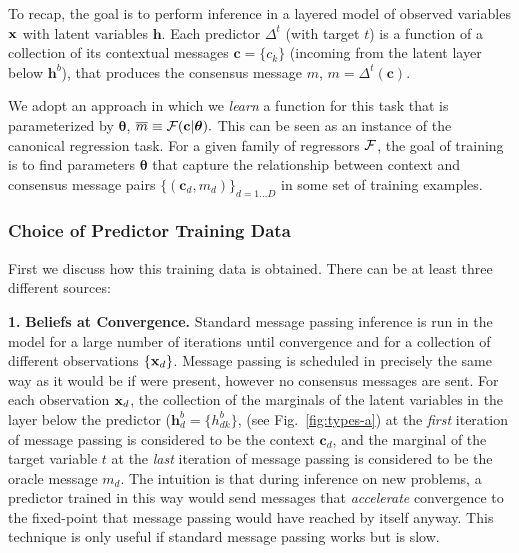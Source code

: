 To recap, the goal is to perform inference in a layered model of observed variables $\mathbf{x}$ with latent variables $\mathbf{h}$. Each predictor $\Delta^t$ (with target $t$) is a function of a collection of its contextual messages $\mathbf{c} = \{ c_k \}$ (incoming from the latent layer below $\mathbf{h}^b$), that produces the consensus message $m$, \ie $m = \Delta^t(\mathbf{c}).$

We adopt an approach in which we \textit{learn} a function for this task that is parameterized by $\bm{\theta}$, \ie $\overline{m} \equiv \mathcal{F}(\mathbf{c}|\bm{\theta}).$ This can be seen as an instance of the canonical regression task. For a given family of regressors $\mathcal{F}$, the goal of training is to find parameters $\bm{\theta}$ that capture the relationship between context and consensus message pairs $\{ (\mathbf{c}_d, m_d) \}_{d=1...D}$ in some set of training examples.

\subsubsection{Choice of Predictor Training Data}

First we discuss how this training data is obtained. There can be at least three different sources:

\textbf{1.\,\,Beliefs at Convergence.} Standard message passing inference is run in the model for a large number of iterations until convergence and for a collection of different observations $\{ \mathbf{x}_d \}$. Message passing is scheduled in precisely the same way as it would be if \MTD were present, however no consensus messages are sent. For each observation $\mathbf{x}_d$, the collection of the marginals of the latent variables in the layer below the predictor ($\mathbf{h}^b_d = \{ h^b_{dk} \}$, (see \eg Fig.~\ref{fig:types-a}) at the \textit{first} iteration of message passing is considered to be the context $\mathbf{c}_d$, and the marginal of the target variable $t$ at the \textit{last} iteration of message passing is considered to be the oracle message $m_d$. The intuition is that during inference on new problems, a predictor trained in this way would send messages that \textit{accelerate}
convergence to the fixed-point that message passing would have reached by itself anyway. This technique is only useful if standard message passing works but is slow.

